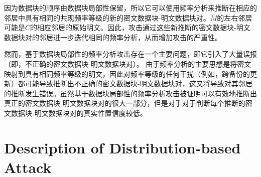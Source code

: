 因为数据块的顺序由数据块局部性保留，所以它可以使用频率分析来推断在相应的邻居中具有相同的共现频率等级的新的密文数据块-明文数据块对。$M$的左右邻居可能是$C$的相应邻居的原始明文。因此，攻击通过这些新推断的密文数据块-明文数据块对的邻居进一步迭代相同的频率分析，从而增加攻击的严重性。

然而，基于数据块局部性的频率分析攻击存在一个主要问题，即它引入了大量误报（即，不正确的密文数据块-明文数据块对）。 由于频率分析的主要思想是将密文映射到具有相同频率等级的明文，因此对频率等级的任何干扰（例如，跨备份的更新）都可能导致推断出不正确的密文数据块-明文数据块对，这又将导致对其邻居的推断发生错误。虽然基于数据块局部性的频率分析攻击被证明可以有效地推断出真正的密文数据块-明文数据块对的很大一部分，但是对手对于判断每个推断的密文数据块-明文数据块对的真实性置信度较低。 







\section{Description of Distribution-based Attack}
\label{sec:distribution-attack-description}

